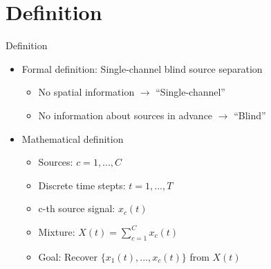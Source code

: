 \documentclass[xcolor=table,mathserif,9pt]{beamer}    %
\begin{document}
\section{Definition}%
\label{sec:definition}
\begin{frame}{Definition}

\begin{itemize}
	\setlength\itemsep{1em}
	\item Formal definition: Single-channel blind source separation
	\begin{itemize}
		\item No spatial information $\to$  ``Single-channel''
		\item No information about sources in advance $\to$ ``Blind''
	\end{itemize}
	\item Mathematical definition
	\begin{itemize}
		\item Sources: $c = 1,...,C$
		\item Discrete time stepts: $t = 1,...,T$
		\item c-th source signal: $x_c(t)$
		\item Mixture: $X(t) = \sum_{c=1}^{C} x_c(t)$
		\item Goal: Recover $\{x_1(t),...,x_c(t)\}$ from $X(t)$
	\end{itemize}
\end{itemize}

\end{frame}
\end{document}
